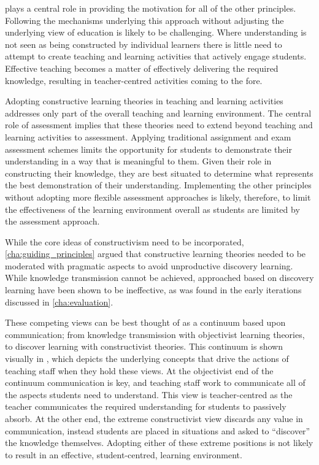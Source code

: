  plays a central role in providing the motivation for all of the other principles. Following the mechanisms underlying this approach without adjusting the underlying view of education is likely to be challenging. Where understanding is not seen as being constructed by individual learners there is little need to attempt to create teaching and learning activities that actively engage students. Effective teaching becomes a matter of effectively delivering the required knowledge, resulting in teacher-centred activities coming to the fore. 

Adopting constructive learning theories in teaching and learning activities addresses only part of the overall teaching and learning environment. The central role of assessment implies that these theories need to extend beyond teaching and learning activities to assessment. Applying traditional assignment and exam assessment schemes limits the opportunity for students to demonstrate their understanding in a way that is meaningful to them. Given their role in constructing their knowledge, they are best situated to determine what represents the best demonstration of their understanding. Implementing the other principles without adopting more flexible assessment approaches is likely, therefore, to limit the effectiveness of the learning environment overall as students are limited by the assessment approach.

While the core ideas of constructivism need to be incorporated, \cref{cha:guiding_principles} argued that constructive learning theories needed to be moderated with pragmatic aspects to avoid unproductive discovery learning. While knowledge transmission cannot be achieved, approached based on discovery learning have been shown to be ineffective, as was found in the early iterations discussed in \cref{cha:evaluation}. 

These competing views can be best thought of as a continuum based upon communication; from knowledge transmission with objectivist learning theories, to discover learning with constructivist theories. This continuum is shown visually in , which depicts the underlying concepts that drive the actions of teaching staff when they hold these views. At the objectivist end of the continuum communication is key, and teaching staff work to communicate all of the aspects students need to understand. This view is teacher-centred as the teacher communicates the required understanding for students to passively absorb. At the other end, the extreme constructivist view discards any value in communication, instead students are placed in situations and asked to ``discover'' the knowledge themselves. Adopting either of these extreme positions is not likely to result in an effective, student-centred, learning environment.

